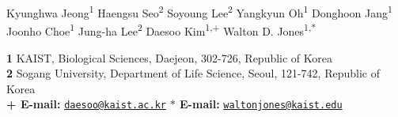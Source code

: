 Kyunghwa Jeong\textsuperscript{1}
Haengsu Seo\textsuperscript{2}
Soyoung Lee\textsuperscript{2}
Yangkyun Oh\textsuperscript{1}
Donghoon Jang\textsuperscript{1}
Joonho Choe\textsuperscript{1}
Jung-ha Lee\textsuperscript{2}
Daesoo Kim\textsuperscript{1,+}
Walton D. Jones\textsuperscript{1,*}

{\bf 1} KAIST, Biological Sciences, Daejeon, 302-726, Republic of Korea
\\
{\bf 2} Sogang University, Department of Life Science, Seoul, 121-742, Republic of Korea
\\
{\bf + E-mail:} \href{mailto:daesoo@kaist.ac.kr}{\nolinkurl{daesoo@kaist.ac.kr}}
{\bf $\ast$ E-mail:} \href{mailto:waltonjones@kaist.edu}{\nolinkurl{waltonjones@kaist.edu}}